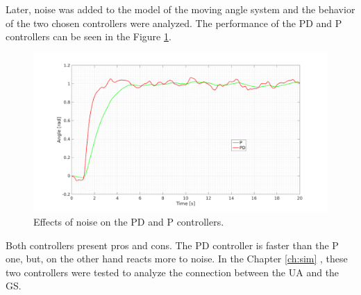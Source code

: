 Later, noise was added to the model of the moving angle system and the behavior of the two chosen controllers were analyzed. The performance of the PD and P controllers can be seen in the Figure \ref{fig:noise_PID}.

\begin{figure}[H]
\centerline{
\includegraphics[scale=0.35]{figures/PD_noise.png}}
\caption{Effects of noise on the PD and P controllers.}
\label{fig:noise_PID}
\end{figure}

Both controllers present pros and cons. The PD controller is faster than the P one, but, on the other hand reacts more to noise. In the Chapter \ref{ch:sim} , these two controllers were tested to analyze the connection between the UA and the GS.